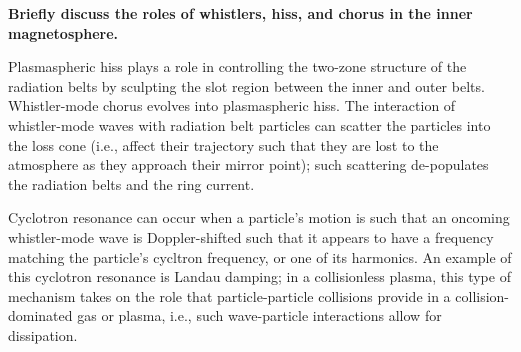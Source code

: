 \textbf{Briefly discuss the roles of whistlers, hiss, and chorus in the
inner magnetosphere.}

Plasmaspheric hiss plays a role in controlling the two-zone structure of
the radiation belts by sculpting the slot region between the inner and
outer belts. Whistler-mode chorus evolves into plasmaspheric hiss. The
interaction of whistler-mode waves with radiation belt particles can
scatter the particles into the loss cone (i.e., affect their trajectory
such that they are lost to the atmosphere as they approach their mirror
point); such scattering de-populates the radiation belts and the ring
current. 

Cyclotron resonance can occur when a particle's motion is such that an
oncoming whistler-mode wave is Doppler-shifted such that it appears to have a
frequency matching the particle's cycltron frequency, or one of its
harmonics. An example of this cyclotron resonance is Landau damping;
in a collisionless plasma, this type of mechanism takes on the role that 
particle-particle collisions provide in a collision-dominated
gas or plasma, i.e., such wave-particle interactions allow for dissipation.
